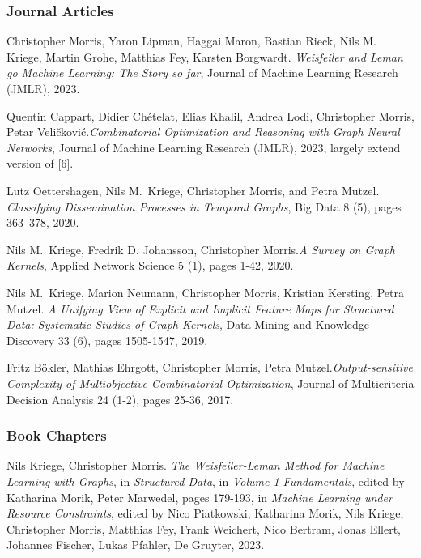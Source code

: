\documentclass[11pt, a4paper, DIV=14, headings=small]{scrartcl}
\begin{document}
\begin{thebibliography}{15}
		\subsubsection*{Journal Articles}
		Christopher Morris, Yaron Lipman, Haggai Maron, Bastian Rieck, Nils M. Kriege, Martin Grohe, Matthias Fey, Karsten Borgwardt.
		\emph{Weisfeiler and Leman go Machine Learning: The Story so far}, Journal of Machine Learning Research (JMLR), 2023.
		
		Quentin Cappart, Didier Chételat, Elias Khalil, Andrea Lodi, Christopher Morris, Petar Veli\v{c}kovi\'{c}.\footnotemark[2]
		\emph{Combinatorial Optimization and Reasoning with Graph Neural Networks},
		Journal of Machine Learning Research (JMLR), 2023, largely extend version of [6].
		
		Lutz Oettershagen, Nils M.~Kriege, Christopher Morris, and Petra Mutzel.
		\emph{Classifying Dissemination Processes in Temporal Graphs},
		Big Data 8 (5), pages 363--378, 2020.
		
		Nils M.~Kriege,  Fredrik D. Johansson, Christopher Morris.\footnotemark[2]
		\emph{A Survey on Graph Kernels},
		Applied Network Science 5 (1), pages 1-42, 2020.
		
		Nils M.~Kriege,  Marion Neumann, Christopher Morris, Kristian Kersting, Petra Mutzel.
		\emph{A Unifying View of Explicit and Implicit Feature Maps for Structured Data: Systematic Studies of Graph Kernels},
		Data Mining and Knowledge Discovery 33 (6), pages 1505-1547, 2019.
		
		Fritz B\"okler, Mathias Ehrgott, Christopher Morris, Petra Mutzel.\footnotemark[1]
		\emph{Output-sensitive Complexity of Multiobjective Combinatorial Optimization},
		Journal of Multicriteria Decision Analysis 24 (1-2), pages 25-36, 2017.
		
		\subsubsection*{Book Chapters}
		
		Nils Kriege, Christopher Morris.
		\emph{The Weisfeiler-Leman Method for Machine Learning with Graphs},
		in \emph{Structured Data}, in \emph{Volume 1 Fundamentals}, edited by Katharina Morik, Peter Marwedel, pages 179-193, in \emph{Machine Learning under Resource Constraints},
		edited by Nico Piatkowski, Katharina Morik, Nils Kriege, Christopher Morris, Matthias Fey, Frank Weichert, Nico Bertram, Jonas Ellert, Johannes Fischer, Lukas Pfahler, De Gruyter, 2023.
		

\end{thebibliography}
\end{document}

